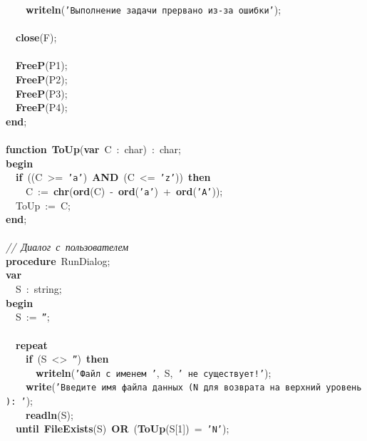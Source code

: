\mbox{}\ \ \ \ \textbf{writeln}(\texttt{'Выполнение\ задачи\ прервано\ из-за\ ошибки'}); \\
\mbox{} \\
\mbox{}\ \ \textbf{close}(F); \\
\mbox{} \\
\mbox{}\ \ \textbf{FreeP}(P1); \\
\mbox{}\ \ \textbf{FreeP}(P2); \\
\mbox{}\ \ \textbf{FreeP}(P3); \\
\mbox{}\ \ \textbf{FreeP}(P4); \\
\mbox{}\textbf{end}; \\
\mbox{} \\
\mbox{}\textbf{function}\ \textbf{ToUp}(\textbf{var}\ C\ :\ char)\ :\ char; \\
\mbox{}\textbf{begin} \\
\mbox{}\ \ \textbf{if}\ ((C\ \textgreater{}=\ \texttt{'a'})\ \textbf{AND}\ (C\ \textless{}=\ \texttt{'z'}))\ \textbf{then} \\
\mbox{}\ \ \ \ C\ :=\ \textbf{chr}(\textbf{ord}(C)\ -\ \textbf{ord}(\texttt{'a'})\ +\ \textbf{ord}(\texttt{'A'})); \\
\mbox{}\ \ ToUp\ :=\ C; \\
\mbox{}\textbf{end}; \\
\mbox{} \\
\mbox{}\textit{//\ Диалог\ с\ пользователем} \\
\mbox{}\textbf{procedure}\ RunDialog; \\
\mbox{}\textbf{var} \\
\mbox{}\ \ S\ :\ string; \\
\mbox{}\textbf{begin} \\
\mbox{}\ \ S\ :=\ \texttt{''}; \\
\mbox{} \\
\mbox{}\ \ \textbf{repeat} \\
\mbox{}\ \ \ \ \textbf{if}\ (S\ \textless{}\textgreater{}\ \texttt{''})\ \textbf{then} \\
\mbox{}\ \ \ \ \ \ \textbf{writeln}(\texttt{'Файл\ с\ именем\ '},\ S,\ \texttt{'\ не\ существует!'}); \\
\mbox{}\ \ \ \ \textbf{write}(\texttt{'Введите\ имя\ файла\ данных\ (N\ для\ возврата\ на\ верхний\ уровень):\ '}); \\
\mbox{}\ \ \ \ \textbf{readln}(S); \\
\mbox{}\ \ \textbf{until}\ \textbf{FileExists}(S)\ \textbf{OR}\ (\textbf{ToUp}(S[1])\ =\ \texttt{'N'}); \\

